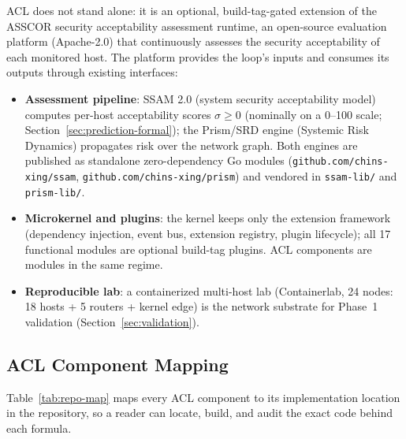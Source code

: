 \documentclass[preprints,article,accept,oneauthor]{Definitions/mdpi}
\begin{document}
ACL does not stand alone: it is an optional, build-tag-gated extension of the
ASSCOR security acceptability assessment runtime, an open-source evaluation
platform (Apache-2.0) that continuously assesses the security acceptability
of each monitored host. The platform provides the loop's inputs and
consumes its outputs through existing interfaces:
\begin{itemize}
\item \textbf{Assessment pipeline}: SSAM 2.0 (system security acceptability
      model) computes per-host acceptability scores $\sigma \ge 0$
      (nominally on a 0--100 scale; Section~\ref{sec:prediction-formal});
      the Prism/SRD engine (Systemic Risk Dynamics) propagates risk over the
      network graph. Both engines are published as standalone zero-dependency
      Go modules (\texttt{github.com/chins-xing/ssam},
      \texttt{github.com/chins-xing/prism}) and vendored in
      \texttt{ssam-lib/} and \texttt{prism-lib/}.
\item \textbf{Microkernel and plugins}: the kernel keeps only the extension
      framework (dependency injection, event bus, extension registry, plugin
      lifecycle); all 17 functional modules are optional build-tag plugins.
      ACL components are modules in the same regime.
\item \textbf{Reproducible lab}: a containerized multi-host lab
      (Containerlab, 24 nodes: 18 hosts + 5 routers + kernel edge) is the
      network substrate for Phase~1
      validation (Section~\ref{sec:validation}).
\end{itemize}

\subsection{ACL Component Mapping}

Table~\ref{tab:repo-map} maps every ACL component to its implementation
location in the repository, so a reader can locate, build, and audit the
exact code behind each formula.
\end{document}
